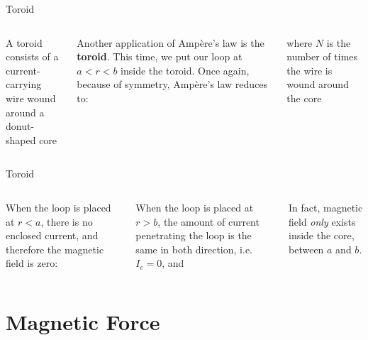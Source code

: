\documentclass[12pt,aspectratio=169]{beamer}
\begin{document}
\begin{frame}{Toroid}
  \begin{columns}

    {\scriptsize A toroid consists of a current-\\
      carrying wire wound around a donut-shaped core \par}
    
    Another application of Amp\`{e}re's law is the \textbf{toroid}. This time,
    we put our loop at $a<r<b$ inside the toroid. Once again, because of
    symmetry, Amp\`{e}re's law reduces to:


    where $N$ is the number of times the wire is wound around the core
  \end{columns}
\end{frame}


\begin{frame}{Toroid}
  \begin{columns}

    When the loop is placed at $r<a$, there is no enclosed
    current, and therefore the magnetic field is zero:


    \vspace{-.2in}When the loop is placed at $r>b$, the amount of current
    penetrating the loop is the same in both direction, i.e.\ $I_c=0$, and

    
    \vspace{-.1in}In fact, magnetic field \emph{only} exists inside the core,
    between $a$ and $b$.
  \end{columns}
\end{frame}




\section{Magnetic Force}
\end{document}
